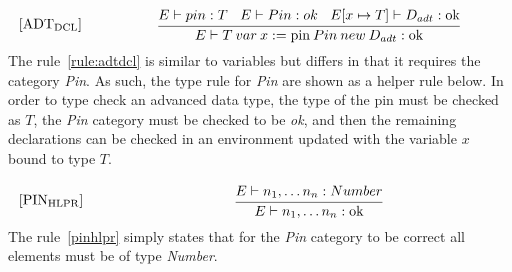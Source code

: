 \begin{equation}\label{rule:adtdcl}
\begin{minipage}{.2\linewidth}
$[\text{ADT}_\text{DCL}]$
\end{minipage}
\begin{minipage}{.8\linewidth}
\centering
$\cfrac{E \vdash pin : T \: \: \: \: E \vdash Pin : ok \: \:  \: \: E[x \mapsto T] \vdash D_{adt} : \text{ok}} {E \vdash T \: var \: x := \text{pin} \: Pin \: new \: D_{adt} : \text{ok}}$
\end{minipage}
\end{equation}
The rule~\ref{rule:adtdcl} is similar to variables but differs in that it requires the category \textit{Pin}. As such, the type rule for \textit{Pin} are shown as a helper rule below. In order to type check an advanced data type, the type of the pin must be checked as $T$, the \textit{Pin} category must be checked to be \textit{ok}, and then the remaining declarations can be checked in an environment updated with the variable $x$ bound to type $T$.

\begin{equation}\label{pinhlpr}
\begin{minipage}{.2\linewidth}
$[\text{PIN}_\text{HLPR}]$
\end{minipage}
\begin{minipage}{.8\linewidth}
\centering
$\cfrac{E \vdash n_1, \dots n_n : Number} {E \vdash n_1, \dots n_n : \text{ok}}$
\end{minipage}
\end{equation}
The rule~\ref{pinhlpr} simply states that for the \textit{Pin} category to be correct all elements must be of type \textit{Number}. 

